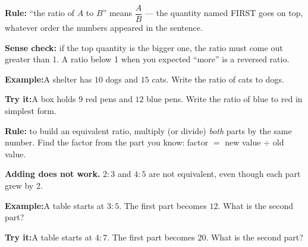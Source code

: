 \documentclass[12pt]{article}
\begin{document}

\begin{formulabox}\textbf{Rule:} ``the ratio of $A$ to $B$'' means $\dfrac{A}{B}$ ---
the quantity named FIRST goes on top, whatever order the numbers appeared in the
sentence.\par
\textbf{Sense check:} if the top quantity is the bigger one, the ratio must come out
greater than 1. A ratio below 1 when you expected ``more'' is a reversed ratio.
\end{formulabox}
\begin{examplebox}\textbf{Example:}\quad A shelter has $10$ dogs and $15$ cats. Write
the ratio of cats to dogs.
\end{examplebox}
\begin{tryitbox}\textbf{Try it:}\quad A box holds $9$ red pens and $12$ blue pens. Write
the ratio of blue to red in simplest form.\\[2pt]
\end{tryitbox}

\begin{formulabox}\textbf{Rule:} to build an equivalent ratio, multiply (or divide)
\emph{both} parts by the same number. Find the factor from the part you know:
factor $=$ new value $\div$ old value.\par
\textbf{Adding does not work.} $2 : 3$ and $4 : 5$ are not equivalent, even though each
part grew by 2.
\end{formulabox}
\begin{examplebox}\textbf{Example:}\quad A table starts at $3 : 5$. The first part
becomes $12$. What is the second part?
\end{examplebox}
\begin{tryitbox}\textbf{Try it:}\quad A table starts at $4 : 7$. The first part becomes
$20$. What is the second part?\\[2pt]
\end{tryitbox}
\end{document}
